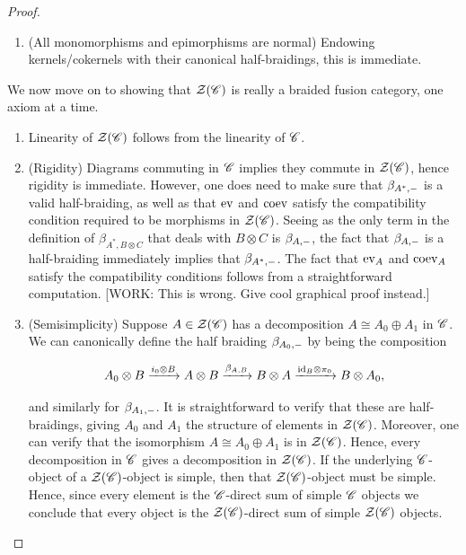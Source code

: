 \documentclass{article}
\theoremstyle{definition}
\numberwithin{figure}{section}
\begin{document}
\begin{proof}
\begin{enumerate}
It is straightforward to show to show that $(\ker f,\beta_{\ker,\--})$ is a valid element of $\Zcal(\Ccat)$, and is the kernel of $f$. This completes the proof.

\item (All monomorphisms and epimorphisms are normal) Endowing kernels/cokernels with their canonical half-braidings, this is immediate.
\end{enumerate}

We now move on to showing that $\Zcal(\Ccat)$ is really a braided fusion category, one axiom at a time.

\begin{enumerate}
\item Linearity of $\Zcal(\Ccat)$ follows from the linearity of $\mathscr{C}$.

\item (Rigidity) Diagrams commuting in $\mathscr{C}$ implies they commute in $\Zcal(\Ccat)$, hence rigidity is immediate. However, one does need to make sure that $\beta_{A^*,\--}$ is a valid half-braiding, as well as that $\mathrm{ev}$ and $\mathrm{coev}$ satisfy the compatibility condition required to be morphisms in $\Zcal(\Ccat)$. Seeing as the only term in the definition of $\beta_{A^*,B\otimes C}$ that deals with $B\otimes C$ is $\beta_{A,\--}$, the fact that $\beta_{A,\--}$ is a half-braiding immediately implies that $\beta_{A^*,\--}$. The fact that $\mathrm{ev}_A$ and $\mathrm{coev}_A$ satisfy the compatibility conditions follows from a straightforward computation. [WORK: This is wrong. Give cool graphical proof instead.]

\item (Semisimplicity) Suppose $A\in \mathcal{Z}(\mathscr{C})$ has a decomposition $A\cong A_0\oplus A_1$ in $\mathscr{C}$. We can canonically define the half braiding $\beta_{A_0,\--}$ by being the composition

$$A_0\otimes B\xrightarrow{i_0\otimes B} A\otimes B \xrightarrow{\beta_{A,B}}B\otimes A \xrightarrow{\mathrm{id}_{B}\otimes \pi_{0}}B\otimes A_0,$$

and similarly for $\beta_{A_1,\--}$. It is straightforward to verify that these are half-braidings, giving $A_0$ and $A_1$ the structure of elements in $\Zcal(\Ccat)$. Moreover, one can verify that the isomorphism $A\cong A_0\oplus A_1$ is in $\Zcal(\Ccat)$. Hence, every decomposition in $\mathscr{C}$ gives a decomposition in $\Zcal(\Ccat)$. If the underlying $\mathscr{C}$-object of a $\Zcal(\Ccat)$-object is simple, then that $\Zcal(\Ccat)$-object must be simple. Hence, since every element is the $\mathscr{C}$-direct sum of simple $\mathscr{C}$ objects we conclude that every object is the $\Zcal(\Ccat)$-direct sum of simple $\Zcal(\Ccat)$ objects.


\end{enumerate}
\end{proof}
\end{document}
